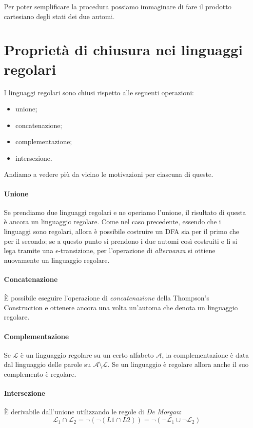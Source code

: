 \documentclass[class=book, crop=false, oneside, 12pt]{standalone}
\begin{document}
Per poter semplificare la procedura possiamo immaginare di fare il prodotto cartesiano degli stati dei due automi.

\section{Proprietà di chiusura nei linguaggi regolari}

I linguaggi regolari sono chiusi rispetto alle seguenti operazioni:
\begin{itemize}
	\item unione;
	\item concatenazione;
	\item complementazione;
	\item intersezione.
\end{itemize}
Andiamo a vedere più da vicino le motivazioni per ciascuna di queste.

\paragraph{Unione}
Se prendiamo due linguaggi regolari e ne operiamo l'unione, il risultato di questa è ancora un linguaggio regolare. Come nel caso precedente, essendo che i linguaggi sono regolari, allora è possibile costruire un DFA sia per il primo che per il secondo; se a questo punto si prendono i due automi così costruiti e li si lega tramite una \(\epsilon\)-transizione, per l'operazione di \emph{alternanza} si ottiene nuovamente 
un linguaggio regolare.

\paragraph{Concatenazione}
È possibile eseguire l'operazione di \emph{concatenazione} della Thompson's Construction e ottenere ancora una volta un'automa che denota un linguaggio regolare.

\paragraph{Complementazione}
Se \(\mathcal{L}\) è un linguaggio regolare su un certo alfabeto \(\mathcal{A}\), la complementazione è data dal linguaggio delle parole su \(\mathcal{A} \setminus \mathcal{L}\). Se un linguaggio è regolare allora anche il suo complemento è regolare. 

\paragraph{Intersezione}
È derivabile dall'unione utilizzando le regole di \emph{De Morgan}: 
\begin{equation*}
    \mathcal{L}_1 \cap \mathcal{L}_2 = \lnot (\lnot (L1 \cap L2)) = \lnot (\lnot \mathcal{L}_1 \cup \lnot \mathcal{L}_2)
\end{equation*}
\end{document}
